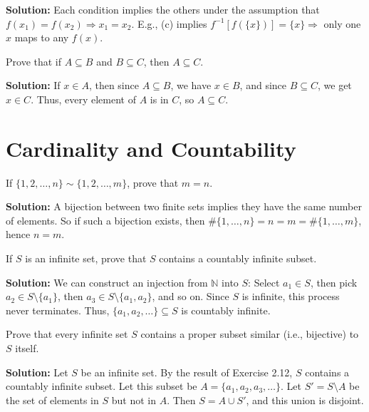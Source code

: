 \textbf{Solution:}  
Each condition implies the others under the assumption that \( f(x_1) = f(x_2) \Rightarrow x_1 = x_2 \).  
E.g., (c) implies \( f^{-1}[f(\{x\})] = \{x\} \Rightarrow \) only one \( x \) maps to any \( f(x) \).

\begin{problembox}
Prove that if \( A \subseteq B \) and \( B \subseteq C \), then \( A \subseteq C \).
\end{problembox}

\textbf{Solution:}  
If \( x \in A \), then since \( A \subseteq B \), we have \( x \in B \), and since \( B \subseteq C \), we get \( x \in C \).  
Thus, every element of \( A \) is in \( C \), so \( A \subseteq C \).

\section{Cardinality and Countability}
\begin{problembox}
If \( \{1, 2, \ldots, n\} \sim \{1, 2, \ldots, m\} \), prove that \( m = n \).
\end{problembox}

\textbf{Solution:}  
A bijection between two finite sets implies they have the same number of elements.  
So if such a bijection exists, then \( \#\{1, \ldots, n\} = n = m = \#\{1, \ldots, m\} \), hence \( n = m \).

\begin{problembox}
If \( S \) is an infinite set, prove that \( S \) contains a countably infinite subset.
\end{problembox}

\textbf{Solution:}  
We can construct an injection from \( \mathbb{N} \) into \( S \):  
Select \( a_1 \in S \), then pick \( a_2 \in S \setminus \{a_1\} \), then \( a_3 \in S \setminus \{a_1, a_2\} \), and so on.  
Since \( S \) is infinite, this process never terminates. Thus, \( \{a_1, a_2, \ldots\} \subseteq S \) is countably infinite.

\begin{problembox}
Prove that every infinite set \( S \) contains a proper subset similar (i.e., bijective) to \( S \) itself.
\end{problembox}

\textbf{Solution:}  
Let $S$ be an infinite set. By the result of Exercise 2.12, $S$ contains a countably infinite subset. Let this subset be $A = \{a_1, a_2, a_3, \dots \}$.
Let $S' = S \setminus A$ be the set of elements in $S$ but not in $A$. Then $S = A \cup S'$, and this union is disjoint.

